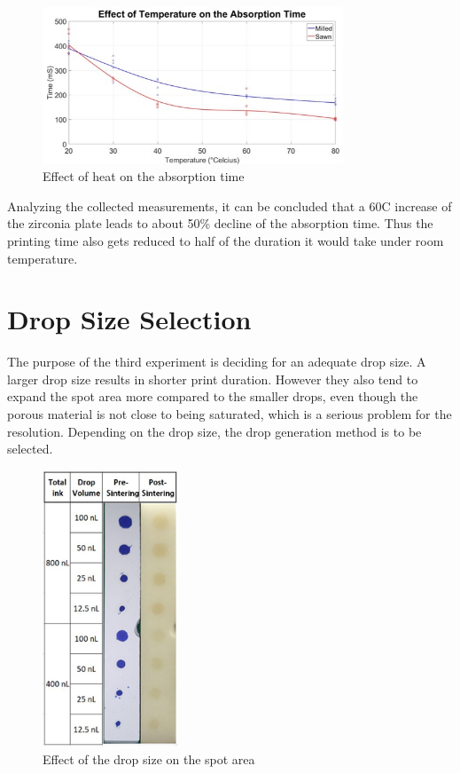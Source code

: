 \begin{figure}[H]
	\centering
	\includegraphics[width=0.8\textwidth]{grafiken/AbsorptionTime.jpg}
	\caption{Effect of heat on the absorption time}
	\label{fig:AbsorptionTime}
\end{figure} 

\bigskip

Analyzing the collected measurements, it can be concluded that a 60\textdegree \space C increase of the zirconia plate leads to about 50\% decline of the absorption time. Thus the printing time also gets reduced to half of the duration it would take under room temperature.
 
\section{Drop Size Selection}
The purpose of the third experiment is deciding for an adequate drop size. A larger drop size results in shorter print duration. However they also tend to expand the spot area more compared to the smaller drops, even though the porous material is not close to being saturated, which is a serious problem for the resolution. Depending on the drop size, the drop generation method is to be selected.
 
\bigskip
\begin{figure}[H]
	\centering
	\includegraphics[width=0.36\textwidth]{grafiken/DropSize.jpg}
	\caption{Effect of the drop size on the spot area}
	\label{fig:DropSize}
\end{figure} 
\bigskip

